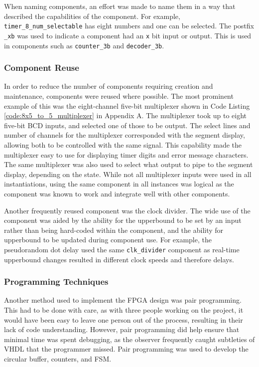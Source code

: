 \documentclass[11pt]{article}
\begin{document}
When naming components, an effort was made to name them in a way that described the capabilities of the component. For example,  \texttt{timer\_8\_num\_selectable} has eight numbers and one can be selected. The postfix \texttt{\_xb} was used to indicate a component had an \texttt{x} bit input or output. This is used in components such as \texttt{counter\_3b} and \texttt{decoder\_3b}.

\subsubsection{Component Reuse}

In order to reduce the number of components requiring creation and maintenance, components were reused where possible. The most prominent example of this was the eight-channel five-bit multiplexer shown in Code Listing \ref{code:8x5_to_5_multiplexer} in Appendix A. The multiplexer took up to eight five-bit BCD inputs, and selected one of those to be output. The select lines and number of channels for the multiplexer corresponded with the segment display, allowing both to be controlled with the same signal. This capability made the multiplexer easy to use for displaying timer digits and error message characters. The same multiplexer was also used to select what output to pipe to the segment display, depending on the state. While not all multiplexer inputs were used in all instantiations, using the same component in all instances was logical as the component was known to work and integrate well with other components.

Another frequently reused component was the clock divider. The wide use of the component was aided by the ability for the upperbound to be set by an input rather than being hard-coded within the component, and the ability for upperbound to be updated during component use.  For example, the pseudorandom dot delay used the same \texttt{clk\_divider} component as real-time upperbound changes resulted in different clock speeds and therefore delays.

\subsubsection{Programming Techniques}

Another method used to implement the FPGA design was pair programming. This had to be done with care, as with three people working on the project, it would have been easy to leave one person out of the process, resulting in their lack of code understanding. However, pair programming did help ensure that minimal time was spent debugging, as the observer frequently caught subtleties of VHDL that the programmer missed. Pair programming was used to develop the circular buffer, counters, and FSM.
\end{document}

